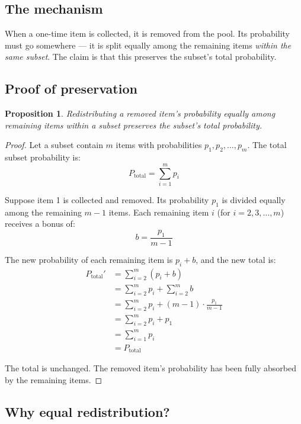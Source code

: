 \documentclass[11pt,a4paper]{article}
\newtheorem{proposition}{Proposition}
\theoremstyle{remark}
\begin{document}
\subsection{The mechanism}

When a one-time item is collected, it is removed from the pool. Its probability must go somewhere --- it is split equally among the remaining items \emph{within the same subset}. The claim is that this preserves the subset's total probability.

\subsection{Proof of preservation}

\begin{proposition}
Redistributing a removed item's probability equally among remaining items within a subset preserves the subset's total probability.
\end{proposition}

\begin{proof}
Let a subset contain $m$ items with probabilities $p_1, p_2, \ldots, p_m$. The total subset probability is:
\[
P_{\text{total}} = \sum_{i=1}^{m} p_i
\]

Suppose item 1 is collected and removed. Its probability $p_1$ is divided equally among the remaining $m - 1$ items. Each remaining item $i$ (for $i = 2, 3, \ldots, m$) receives a bonus of:
\[
b = \frac{p_1}{m - 1}
\]

The new probability of each remaining item is $p_i + b$, and the new total is:
\begin{align*}
P_{\text{total}}' &= \sum_{i=2}^{m} (p_i + b) \\[6pt]
&= \sum_{i=2}^{m} p_i + \sum_{i=2}^{m} b \\[6pt]
&= \sum_{i=2}^{m} p_i + (m-1) \cdot \frac{p_1}{m-1} \\[6pt]
&= \sum_{i=2}^{m} p_i + p_1 \\[6pt]
&= \sum_{i=1}^{m} p_i \\[6pt]
&= P_{\text{total}}
\end{align*}

The total is unchanged. The removed item's probability has been fully absorbed by the remaining items.
\end{proof}

\subsection{Why equal redistribution?}
\end{document}
